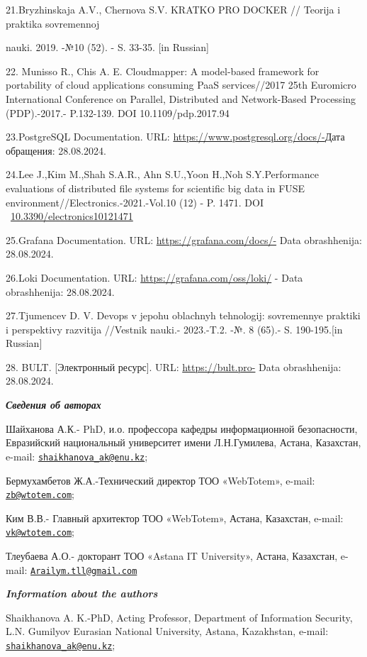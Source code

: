 {21.Bryzhinskaja A.V., Chernova S.V. KRATKO PRO DOCKER // Teorija i
praktika sovremennoj

nauki. 2019. -№10 (52). - S. 33-35. {[}in Russian{]}

22. Munisso R., Chis A. E. Cloudmapper: A model-based framework for
portability of cloud applications consuming PaaS services//2017 25th
Euromicro International Conference on Parallel, Distributed and
Network-Based Processing (PDP).-2017.- P.132-139. DOI
10.1109/pdp.2017.94

23.PostgreSQL Documentation. URL:
\url{https://www.postgresql.org/docs/-}Дата обращения: 28.08.2024.

24.Lee J.,Kim M.,Shah S.A.R., Ahn S.U.,Yoon H.,Noh S.Y.Performance
evaluations of distributed file systems for scientific big data in FUSE
environment//Electronics.-2021.-Vol.10 (12) - P. 1471. DOI
~\href{https://doi.org/10.3390/electronics10121471}{10.3390/electronics10121471}

25.Grafana Documentation. URL: \url{https://grafana.com/docs/-} Data
obrashhenija: 28.08.2024.

26.Loki Documentation. URL: \url{https://grafana.com/oss/loki/} - Data
obrashhenija: 28.08.2024.

27.Tjumencev D. V. Devops v jepohu oblachnyh tehnologij: sovremennye
praktiki i perspektivy razvitija //Vestnik nauki.- 2023.-T.2. -№. 8
(65).- S. 190-195.{[}in Russian{]}

28. BULT. {[}Электронный ресурс{]}. URL: \url{https://bult.pro-} Data
obrashhenija: 28.08.2024.

\emph{{\bfseries Сведения об авторах}}

Шайханова А.К.- PhD, и.о. профессора кафедры информационной
безопасности, Евразийский национальный университет имени Л.Н.Гумилева,
Астана, Казахстан, e-mail:
\href{mailto:shaikhanova_ak@enu.kz}{\nolinkurl{shaikhanova\_ak@enu.kz}};

Бермухамбетов Ж.А.-Технический директор ТОО «WebTotem», e-mail:
\href{mailto:zb@wtotem.com}{\nolinkurl{zb@wtotem.com}};

Ким В.В.- Главный архитектор ТОО «WebTotem», Астана, Казахстан, e-mail:
\href{mailto:vk@wtotem.com}{\nolinkurl{vk@wtotem.com}};

Тлеубаева А.О.- докторант ТОО «Astana IT University», Астана, Казахстан,
e-mail:
\href{mailto:Arailym.tll@gmail.com}{\nolinkurl{Arailym.tll@gmail.com}}

\emph{{\bfseries Information about the authors}}

Shaikhanova A. K.-PhD, Acting Professor, Department of Information
Security, L.N. Gumilyov Eurasian National University, Astana,
Kazakhstan, e-mail:
\href{mailto:shaikhanova_ak@enu.kz}{\nolinkurl{shaikhanova\_ak@enu.kz}};

}
